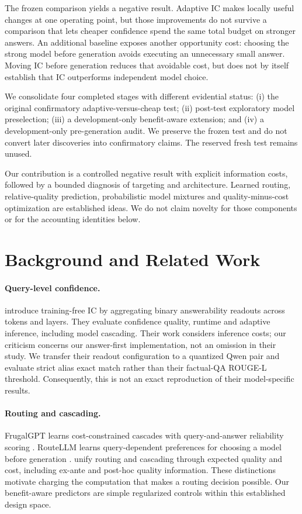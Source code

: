 \documentclass[11pt]{article}
\begin{document}
The frozen comparison yields a negative result. Adaptive IC makes locally useful changes at one operating point, but those improvements do not survive a comparison that lets cheaper confidence spend the same total budget on stronger answers. An additional baseline exposes another opportunity cost: choosing the strong model before generation avoids executing an unnecessary small answer. Moving IC before generation reduces that avoidable cost, but does not by itself establish that IC outperforms independent model choice.

We consolidate four completed stages with different evidential status: (i) the original confirmatory adaptive-versus-cheap test; (ii) post-test exploratory model preselection; (iii) a development-only benefit-aware extension; and (iv) a development-only pre-generation audit. We preserve the frozen test and do not convert later discoveries into confirmatory claims. The reserved fresh test remains unused.

Our contribution is a controlled negative result with explicit information costs, followed by a bounded diagnosis of targeting and architecture. Learned routing, relative-quality prediction, probabilistic model mixtures and quality-minus-cost optimization are established ideas. We do not claim novelty for those components or for the accounting identities below.

\section{Background and Related Work}
\paragraph{Query-level confidence.}
\citet{chen2026query} introduce training-free IC by aggregating binary answerability readouts across tokens and layers. They evaluate confidence quality, runtime and adaptive inference, including model cascading. Their work considers inference costs; our criticism concerns our answer-first implementation, not an omission in their study. We transfer their readout configuration to a quantized Qwen pair and evaluate strict alias exact match rather than their factual-QA ROUGE-L threshold. Consequently, this is not an exact reproduction of their model-specific results.

\paragraph{Routing and cascading.}
FrugalGPT learns cost-constrained cascades with query-and-answer reliability scoring \citep{chen2023frugalgpt}. RouteLLM learns query-dependent preferences for choosing a model before generation \citep{ong2025routellm}. \citet{dekoninck2026unified} unify routing and cascading through expected quality and cost, including ex-ante and post-hoc quality information. These distinctions motivate charging the computation that makes a routing decision possible. Our benefit-aware predictors are simple regularized controls within this established design space.
\end{document}
